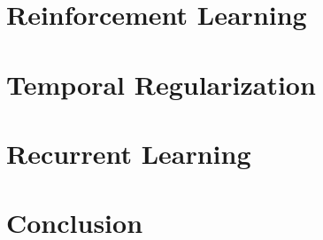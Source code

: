 \documentclass[12pt, oneside, extrafontsizes]{memoir}
\begin{document}
\chapter{Reinforcement Learning}
\label{chap:reinforcement}



\chapter{Temporal Regularization}
\label{chap:temporal}



\chapter{Recurrent Learning}
\label{chap:recurrent}




\chapter{Conclusion}


%
%
\printbibliography
\end{document}
